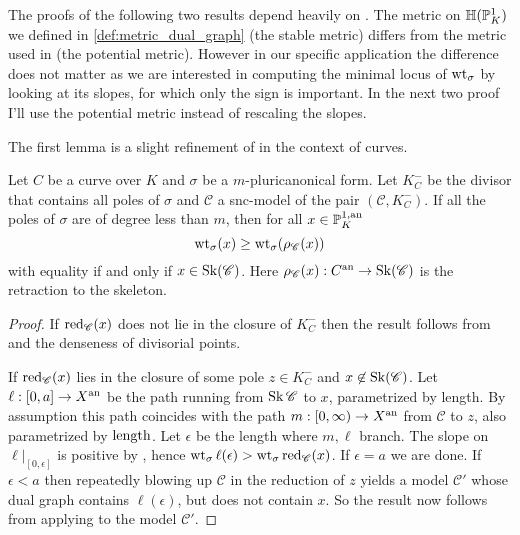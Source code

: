 The proofs of the following two results depend heavily on \cite[thm.\ 3.2.3]{bakerWeightFunctionsBerkovich2016}. 
	The metric on $\mathbb{H}(\mathbb{P}^{1}_K)$ we defined in \cref{def:metric_dual_graph} (the stable metric) differs from the metric used in \cite{bakerWeightFunctionsBerkovich2016} (the potential metric). 
	However in our specific application the difference does not matter as we are interested in computing the minimal locus of $\operatorname{wt}_\sigma$ by looking at its slopes, for which only the sign is important.
	In the next two proof I'll use the potential metric instead of rescaling the slopes.

	The first lemma is a slight refinement of \cite[prop.\ 4.4.4]{mustataWeightFunctionsNonArchimedean2015} in the context of curves.
	\begin{lemma}\label{lem:well_behaved_pole_weight}
	Let $C$ be a curve over $K$ and $\sigma$ be a $m$-pluricanonical form.
	Let $K_C^{-}$ be the divisor that contains all poles of $\sigma$ and $\mathscr C$ a snc-model of the pair $(\mathscr C, K_C^{-})$.  
	If all the poles of $\sigma$ are of degree less than $m$, then for all $x \in \mathbb{P}^{1, \text{an}}_K$ \[
		\operatorname{wt}_\sigma(x) \ge \operatorname{wt}_\sigma(\rho_{\mathscr C}(x))
	\] 
	with equality if and only if $x \in \operatorname{Sk}(\mathscr C)$. 
	Here $\rho_{\mathscr C}(x): C{}^{\text{an}} \to \operatorname{Sk}(\mathscr C)$ is the retraction to the skeleton.
\end{lemma}
\begin{proof}
	If $\operatorname{red}_{\mathscr C}(x)$ does not lie in the closure of $K_C^{-}$ then the result follows from \cite[prop.\ 4.4.4.(2)]{mustataWeightFunctionsNonArchimedean2015} and the denseness of divisorial points. 

	If $\operatorname{red}_{\mathscr C}(x)$ lies in the closure of some pole $z \in K_C^{-}$ and $x \not\in \operatorname{Sk}(\mathscr C)$. 
	Let $\ell: [0, a] \to X{}^{\text{an}}$ be the path running from $\operatorname{Sk} \mathscr C$ to $x$, parametrized by length. 
	By assumption this path coincides with the path $m: [0, \infty) \to X{}^{\text{an}}$ from $\mathscr C$ to $z$, also parametrized by $\operatorname{length}$.
	Let $\epsilon$ be the length where $m, \ell$ branch. 
	The slope on  $\ell|_{[0, \epsilon]}$ is positive by \cite[thm.\ 3.2.3.(2)]{bakerWeightFunctionsBerkovich2016} , hence $\wt_\sigma \ell(\epsilon) > \wt_\sigma \red_{\mathscr C}(x)$.
	If $\epsilon = a$ we are done. 
	If $\epsilon < a$ then repeatedly blowing up $\mathscr C$ in the reduction of $z$ yields a model $\mathscr C'$ whose dual graph contains $\ell(\epsilon)$, but does not contain $x$.
	So the result now follows from applying \cite[prop.\ 4.4.4.(2)]{mustataWeightFunctionsNonArchimedean2015} to the model $\mathscr C'$. 
\end{proof}

